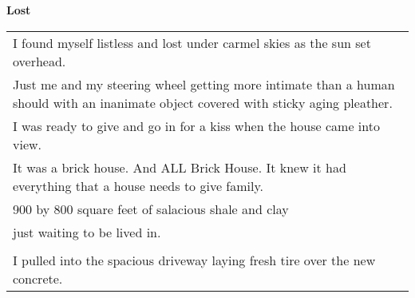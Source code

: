 \documentclass{article}
\begin{document}
\begin{center}
\textbf{Lost}\\
\begin{tabular}{l}
\\
I found myself listless and lost under carmel skies as the sun set overhead. \\
Just me and my steering wheel getting more intimate than a human should with
an inanimate object covered with sticky aging pleather. \\
I was ready to give and go in for a kiss when the house came into view. \\
It was a brick house.  And ALL Brick House.  It knew it had everything
that a house needs to give family.  \\
900 by 800 square feet of salacious shale and clay \\
just waiting to be lived in. \\
\\
I pulled into the spacious driveway laying fresh tire over the new concrete.

\\
\end{tabular}
\end{center}
\end{document}
